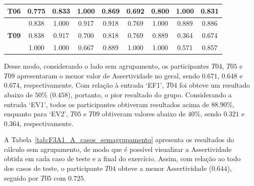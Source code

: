 \begin{table}[htbp]
\begin{tabular}{|ccccccccc|}
		\multicolumn{1}{|c|}{\textbf{T06}} & \multicolumn{1}{c|}{0.775} & \multicolumn{1}{c|}{0.833} & \multicolumn{1}{c|}{1.000} & \multicolumn{1}{c|}{0.869} & \multicolumn{1}{c|}{0.692} & \multicolumn{1}{c|}{0.800} & \multicolumn{1}{c|}{1.000} & 0.831 \\ \hline
		\rowcolor[HTML]{F2F2F2} 
		\multicolumn{1}{|c|}{\cellcolor[HTML]{F2F2F2}\textbf{T08}} & \multicolumn{1}{c|}{\cellcolor[HTML]{F2F2F2}0.838} & \multicolumn{1}{c|}{\cellcolor[HTML]{F2F2F2}1.000} & \multicolumn{1}{c|}{\cellcolor[HTML]{F2F2F2}0.917} & \multicolumn{1}{c|}{\cellcolor[HTML]{F2F2F2}0.918} & \multicolumn{1}{c|}{\cellcolor[HTML]{F2F2F2}0.769} & \multicolumn{1}{c|}{\cellcolor[HTML]{F2F2F2}1.000} & \multicolumn{1}{c|}{\cellcolor[HTML]{F2F2F2}0.889} & 0.886 \\ \hline
		\multicolumn{1}{|c|}{\textbf{T09}} & \multicolumn{1}{c|}{0.838} & \multicolumn{1}{c|}{0.917} & \multicolumn{1}{c|}{0.700} & \multicolumn{1}{c|}{0.818} & \multicolumn{1}{c|}{0.769} & \multicolumn{1}{c|}{0.889} & \multicolumn{1}{c|}{0.364} & 0.674 \\ \hline
		\rowcolor[HTML]{F2F2F2} 
		\multicolumn{1}{|c|}{\cellcolor[HTML]{F2F2F2}\textbf{T10}} & \multicolumn{1}{c|}{\cellcolor[HTML]{F2F2F2}1.000} & \multicolumn{1}{c|}{\cellcolor[HTML]{F2F2F2}1.000} & \multicolumn{1}{c|}{\cellcolor[HTML]{F2F2F2}0.667} & \multicolumn{1}{c|}{\cellcolor[HTML]{F2F2F2}0.889} & \multicolumn{1}{c|}{\cellcolor[HTML]{F2F2F2}1.000} & \multicolumn{1}{c|}{\cellcolor[HTML]{F2F2F2}1.000} & \multicolumn{1}{c|}{\cellcolor[HTML]{F2F2F2}0.571} & 0.857 \\ \hline
	\end{tabular}
	\label{tab:F3A1_A_entradas}
\end{table}

Desse modo, considerando o lado sem agrupamento, os participantes $T04$, $T05$ e $T09$ apresentaram o menor valor de Assertividade no geral, sendo $0.671$, $0.648$ e $0.674$, respectivamente.  Com relação à entrada `EF1', $T04$ foi obteve um resultado abaixo de $50\%$ ($0.458$), portanto, o pior resultado do grupo. Considerando a entrada `EV1', todos os participantes obtiveram resultados acima de $88.90\%$, enquanto para `EV2', $T05$ e $T09$ obtiveram valores abaixo de $40\%$, sendo $0.321$ e $0.364$, respectivamente.

A Tabela~\ref{tab:F3A1_A_casos_semagrupamento} apresenta os resultados do cálculo sem agrupamento, de modo que é possível visualizar a Assertividade obtida em cada caso de teste e a final do exercício. Assim, com relação ao todo dos casos de teste, o participante $T04$ obteve a menor Assertividade ($0.644$), seguido por $T05$ com $0.725$.

